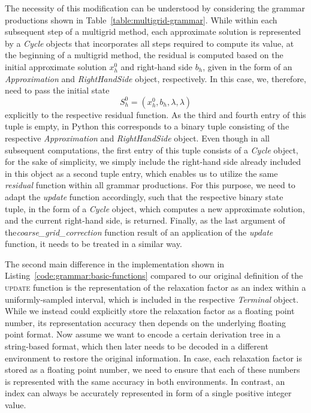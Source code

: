 The necessity of this modification can be understood by considering the grammar productions shown in Table~\ref{table:multigrid-grammar}.
While within each subsequent step of a multigrid method, each approximate solution is represented by a \emph{Cycle} objects that incorporates all steps required to compute its value, at the beginning of a multigrid method, the residual is computed based on the initial approximate solution $x_h^0$ and right-hand side $b_h$, given in the form of an \emph{Approximation} and \emph{RightHandSide} object, respectively.
In this case, we, therefore, need to pass the initial state 
\begin{equation*}
	S_h^0 = (x_h^0, b_h, \lambda, \lambda)
\end{equation*} explicitly to the respective residual function.
As the third and fourth entry of this tuple is empty, in Python this corresponds to a binary tuple consisting of the respective \emph{Approximation} and \emph{RightHandSide} object.
Even though in all subsequent computations, the first entry of this tuple consists of a \emph{Cycle} object, for the sake of simplicity, we simply include the right-hand side already included in this object as a second tuple entry, which enables us to utilize the same \emph{residual} function within all grammar productions.
For this purpose, we need to adapt the \emph{update} function accordingly, such that the respective binary state tuple, in the form of a \emph{Cycle} object, which computes a new approximate solution, and the current right-hand side, is returned.
Finally, as the last argument of the\emph{coarse\_grid\_correction} function result of an application of the \emph{update} function, it needs to be treated in a similar way.

The second main difference in the implementation shown in Listing~\ref{code:grammar:basic-functions} compared to our original definition of the \textsc{update} function is the representation of the relaxation factor as an index within a uniformly-sampled interval, which is included in the respective \emph{Terminal} object.
While we instead could explicitly store the relaxation factor as a floating point number, its representation accuracy then depends on the underlying floating point format.
Now assume we want to encode a certain derivation tree in a string-based format, which then later needs to be decoded in a different environment to restore the original information.
In case, each relaxation factor is stored as a floating point number, we need to ensure that each of these numbers is represented with the same accuracy in both environments.
In contrast, an index can always be accurately represented in form of a single positive integer value.

